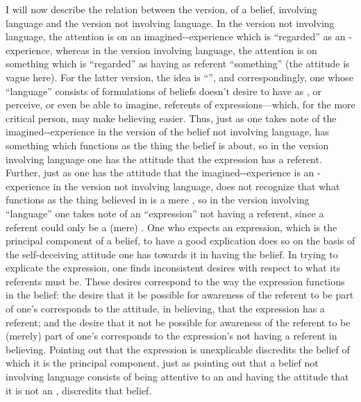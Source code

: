  I will now describe the relation between the version, of a belief, involving language and the version not involving language. In the version not involving language, the attention is on an imagined-\x-experience which is \enquote{regarded} as an \x-experience, whereas in the version involving language, the attention is on something which is \enquote{regarded} as having as referent \enquote{something} (the attitude is vague here). For the latter version, the idea is \enquote{}, and correspondingly, one whose \enquote{language} consists of formulations of beliefs doesn't desire to have as , or perceive, or even be able to imagine, referents of expressions---which, for the more critical person, may make believing easier. Thus, just as one takes note of the imagined-\x-experience in the version of the belief not involving language, has something which functions as the thing the belief is about, so in the version involving language one has the attitude that the expression has a referent. Further, just as one has the attitude that the imagined-\x-experience is an \x-experience in the version not involving language, does not recognize that what functions as the thing believed in is a mere , so in the version involving \enquote{language} one takes note of an \enquote{expression} not having a referent, since a referent could only be a (mere) . One who expects an expression, which is the principal component of a belief, to have a good explication does so on the basis of the self-deceiving attitude one has towards it in having the belief. In trying to explicate the expression, one finds inconsistent desires with respect to what its referents must be. These desires correspond to the way the expression functions in the belief: the desire that it be possible for awareness of the referent to be part of one's  corresponds to the attitude, in believing, that the expression has a referent; and the desire that it not be possible for awareness of the referent to be (merely) part of one's  corresponds to the expression's not having a referent in believing. Pointing out that the expression is unexplicable discredits the belief of which it is the principal component, just as pointing out that a belief not involving language consists of being attentive to an  and having the attitude that it is not an , discredits that belief. 

